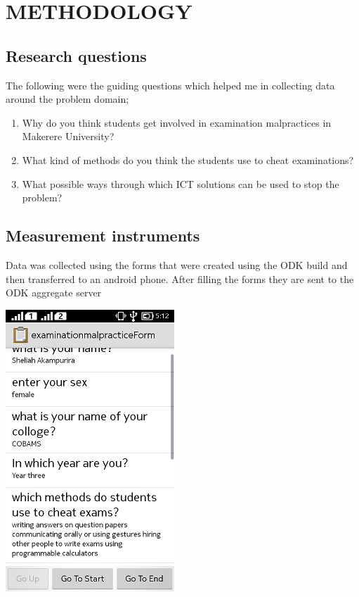 \documentclass [8 pt]{article}
\begin{document}
\section { METHODOLOGY}
\subsection {Research questions}
 The following were the guiding questions which helped me in collecting data around the problem domain;
\begin {enumerate}
\item  Why do you think students get involved in examination malpractices in Makerere University?
\item What kind of methods do you think the students use to cheat examinations?
\item What possible ways through which ICT solutions can be used to stop the problem?

\end{enumerate}
\subsection {Measurement instruments}
Data was collected using the forms that were created using the ODK build and then transferred to an android phone. After filling the forms they are sent to the ODK aggregate server 

\includegraphics{pic1}
\end{document}
